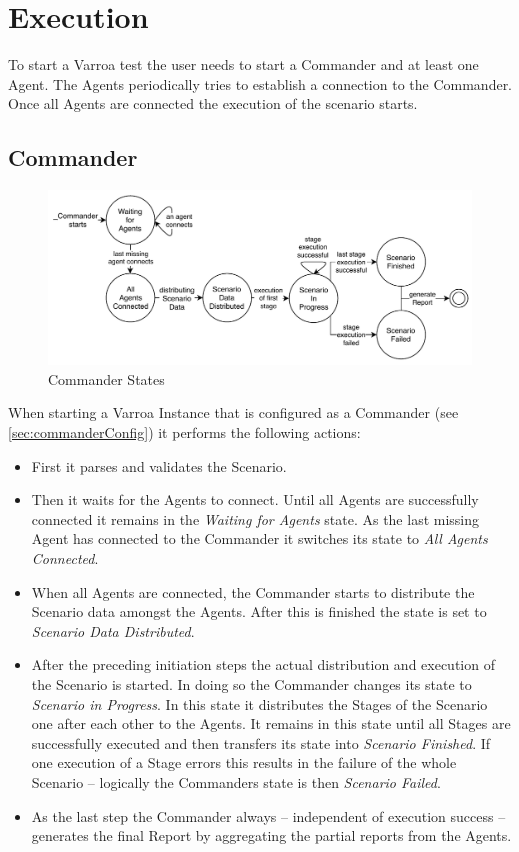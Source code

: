 \chapter{Execution}\label{sec:Execution}
To start a Varroa test the user needs to start a Commander and at least one Agent.
The Agents periodically tries to establish a connection to the Commander.
Once all Agents are connected the execution of the scenario starts.\\

\section{Commander}
\begin{figure}[H]
	\begin{center}
	\includegraphics[scale=0.9]{Resources/PDF/CommanderStates}
	\caption{Commander States}
	\label{pic:CommanderStates}
	\end{center}
\end{figure}
When starting a Varroa Instance that is configured as a Commander (see \ref{sec:commanderConfig}) it performs the following actions:
\begin{itemize}
	\item First it parses and validates the Scenario.
	\item Then it waits for the Agents to connect.
	Until all Agents are successfully connected it remains in the \emph{Waiting for Agents} state.
	As the last missing Agent has connected to the Commander it switches its state to \emph{All Agents Connected}.
	\item When all Agents are connected, the Commander starts to distribute the Scenario data amongst the Agents. After this is finished the state is set to \emph{Scenario Data Distributed}.
	\item After the preceding initiation steps the actual distribution and execution of the Scenario is started.
	In doing so the Commander changes its state to \emph{Scenario in Progress}.
	In this state it distributes the Stages of the Scenario one after each other to the Agents.
	It remains in this state until all Stages are successfully executed and then transfers its state into \emph{Scenario Finished}.
	If one execution of a Stage errors this results in the failure of the whole Scenario -- logically the Commanders state is then \emph{Scenario Failed}.
	\item As the last step the Commander always -- independent of execution success -- generates the final Report by aggregating the partial reports from the Agents.
\end{itemize}

